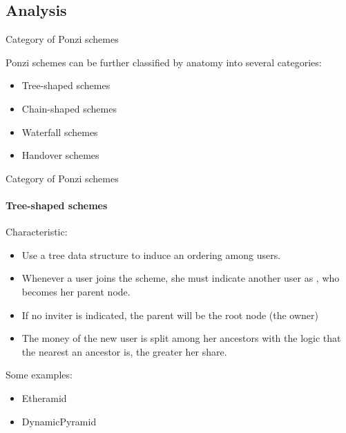 \documentclass[aspectratio=169,10pt]{beamer}
\begin{document}
\subsection{Analysis}

\begin{frame}{Category of Ponzi schemes}

Ponzi schemes can be further classified by anatomy into several categories:

\begin{itemize}
\item Tree-shaped schemes
\item Chain-shaped schemes
\item Waterfall schemes
\item Handover schemes
\end{itemize}

\end{frame}

\begin{frame}{Category of Ponzi schemes}
\framesubtitle{Tree-shaped schemes}

Characteristic:
\begin{itemize}
\item Use a tree data structure to induce an ordering among users.
\item Whenever a user joins the scheme, she must indicate another user as
, who becomes her parent node.
\item If no inviter is indicated, the parent will be the root node (the owner)
\item The money of the new user is split among her ancestors with the logic
that the nearest an ancestor is, the greater her share.
\end{itemize} \bigskip

Some examples:
\begin{itemize}
\item Etheramid
\item DynamicPyramid
\end{itemize}

\end{frame}
\end{document}

